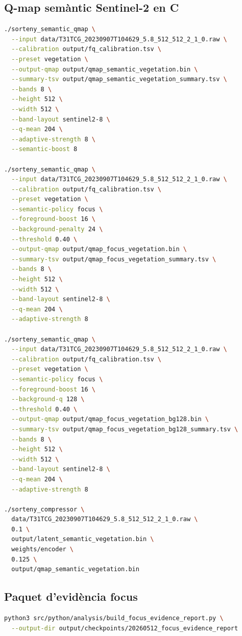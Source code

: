 \documentclass[11pt,a4paper]{article}
\begin{document}
\subsection{Q-map semàntic Sentinel-2 en C}

\begin{lstlisting}[language=bash]
./sorteny_semantic_qmap \
  --input data/T31TCG_20230907T104629_5.8_512_512_2_1_0.raw \
  --calibration output/fq_calibration.tsv \
  --preset vegetation \
  --output-qmap output/qmap_semantic_vegetation.bin \
  --summary-tsv output/qmap_semantic_vegetation_summary.tsv \
  --bands 8 \
  --height 512 \
  --width 512 \
  --band-layout sentinel2-8 \
  --q-mean 204 \
  --adaptive-strength 8 \
  --semantic-boost 8

./sorteny_semantic_qmap \
  --input data/T31TCG_20230907T104629_5.8_512_512_2_1_0.raw \
  --calibration output/fq_calibration.tsv \
  --preset vegetation \
  --semantic-policy focus \
  --foreground-boost 16 \
  --background-penalty 24 \
  --threshold 0.40 \
  --output-qmap output/qmap_focus_vegetation.bin \
  --summary-tsv output/qmap_focus_vegetation_summary.tsv \
  --bands 8 \
  --height 512 \
  --width 512 \
  --band-layout sentinel2-8 \
  --q-mean 204 \
  --adaptive-strength 8

./sorteny_semantic_qmap \
  --input data/T31TCG_20230907T104629_5.8_512_512_2_1_0.raw \
  --calibration output/fq_calibration.tsv \
  --preset vegetation \
  --semantic-policy focus \
  --foreground-boost 16 \
  --background-q 128 \
  --threshold 0.40 \
  --output-qmap output/qmap_focus_vegetation_bg128.bin \
  --summary-tsv output/qmap_focus_vegetation_bg128_summary.tsv \
  --bands 8 \
  --height 512 \
  --width 512 \
  --band-layout sentinel2-8 \
  --q-mean 204 \
  --adaptive-strength 8

./sorteny_compressor \
  data/T31TCG_20230907T104629_5.8_512_512_2_1_0.raw \
  0.1 \
  output/latent_semantic_vegetation.bin \
  weights/encoder \
  0.125 \
  output/qmap_semantic_vegetation.bin
\end{lstlisting}

\subsection{Paquet d'evidència focus}

\begin{lstlisting}[language=bash]
python3 src/python/analysis/build_focus_evidence_report.py \
  --output-dir output/checkpoints/20260512_focus_evidence_report
\end{lstlisting}
\end{document}

